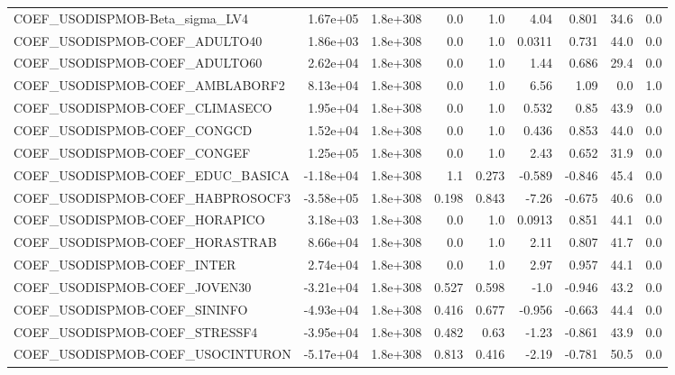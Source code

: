 \begin{tabular}{lrrrrrrrr}
COEF\_USODISPMOB-Beta\_sigma\_LV4    &    1.67e+05 &     1.8e+308 &      0.0 &      1.0 &       4.04 &       0.801 &         34.6 &           0.0 \\
COEF\_USODISPMOB-COEF\_ADULTO40     &    1.86e+03 &     1.8e+308 &      0.0 &      1.0 &     0.0311 &       0.731 &         44.0 &           0.0 \\
COEF\_USODISPMOB-COEF\_ADULTO60     &    2.62e+04 &     1.8e+308 &      0.0 &      1.0 &       1.44 &       0.686 &         29.4 &           0.0 \\
COEF\_USODISPMOB-COEF\_AMBLABORF2   &    8.13e+04 &     1.8e+308 &      0.0 &      1.0 &       6.56 &        1.09 &          0.0 &           1.0 \\
COEF\_USODISPMOB-COEF\_CLIMASECO    &    1.95e+04 &     1.8e+308 &      0.0 &      1.0 &      0.532 &        0.85 &         43.9 &           0.0 \\
COEF\_USODISPMOB-COEF\_CONGCD       &    1.52e+04 &     1.8e+308 &      0.0 &      1.0 &      0.436 &       0.853 &         44.0 &           0.0 \\
COEF\_USODISPMOB-COEF\_CONGEF       &    1.25e+05 &     1.8e+308 &      0.0 &      1.0 &       2.43 &       0.652 &         31.9 &           0.0 \\
COEF\_USODISPMOB-COEF\_EDUC\_BASICA  &   -1.18e+04 &     1.8e+308 &      1.1 &    0.273 &     -0.589 &      -0.846 &         45.4 &           0.0 \\
COEF\_USODISPMOB-COEF\_HABPROSOCF3  &   -3.58e+05 &     1.8e+308 &    0.198 &    0.843 &      -7.26 &      -0.675 &         40.6 &           0.0 \\
COEF\_USODISPMOB-COEF\_HORAPICO     &    3.18e+03 &     1.8e+308 &      0.0 &      1.0 &     0.0913 &       0.851 &         44.1 &           0.0 \\
COEF\_USODISPMOB-COEF\_HORASTRAB    &    8.66e+04 &     1.8e+308 &      0.0 &      1.0 &       2.11 &       0.807 &         41.7 &           0.0 \\
COEF\_USODISPMOB-COEF\_INTER        &    2.74e+04 &     1.8e+308 &      0.0 &      1.0 &       2.97 &       0.957 &         44.1 &           0.0 \\
COEF\_USODISPMOB-COEF\_JOVEN30      &   -3.21e+04 &     1.8e+308 &    0.527 &    0.598 &       -1.0 &      -0.946 &         43.2 &           0.0 \\
COEF\_USODISPMOB-COEF\_SININFO      &   -4.93e+04 &     1.8e+308 &    0.416 &    0.677 &     -0.956 &      -0.663 &         44.4 &           0.0 \\
COEF\_USODISPMOB-COEF\_STRESSF4     &   -3.95e+04 &     1.8e+308 &    0.482 &     0.63 &      -1.23 &      -0.861 &         43.9 &           0.0 \\
COEF\_USODISPMOB-COEF\_USOCINTURON  &   -5.17e+04 &     1.8e+308 &    0.813 &    0.416 &      -2.19 &      -0.781 &         50.5 &           0.0 \\
\bottomrule
\end{tabular}
